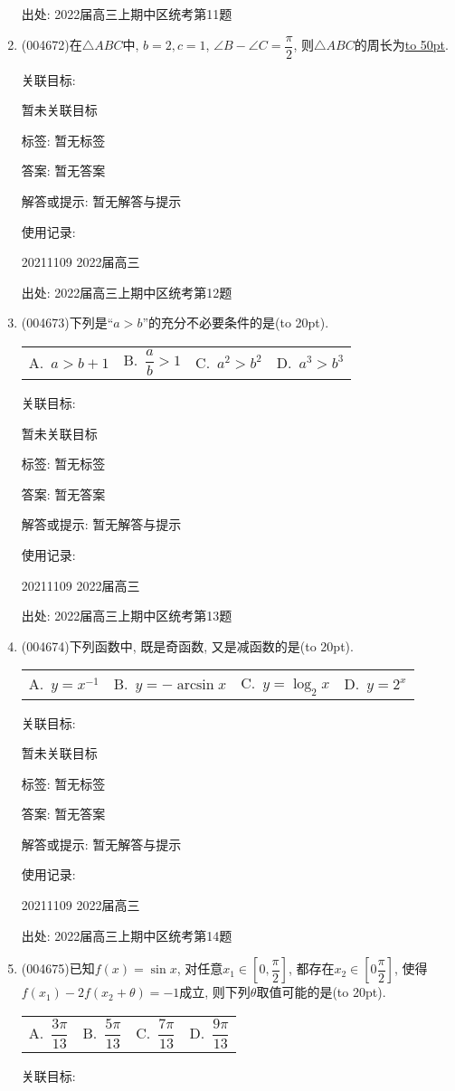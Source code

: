 \documentclass[10pt,a4paper]{article}
\newcommand{\blank}[1]{\underline{\hbox to #1pt{}}}
\newcommand{\bracket}[1]{(\hbox to #1pt{})}
\newcommand{\fourch}[4]{\par\begin{tabular}{p{.23\textwidth}p{.23\textwidth}p{.23\textwidth}p{.23\textwidth}}
A.~#1 &B.~#2& C.~#3& D.~#4
\end{tabular}}
\begin{document}
\begin{enumerate}[1.]
出处: 2022届高三上期中区统考第11题
\item { (004672)}在$\triangle ABC$中, $b=2,c=1$, $\angle B-\angle C=\dfrac{\pi}2$, 则$\triangle ABC$的周长为\blank{50}.


关联目标:

暂未关联目标



标签: 暂无标签

答案: 暂无答案

解答或提示: 暂无解答与提示

使用记录:

20211109	2022届高三	


出处: 2022届高三上期中区统考第12题
\item { (004673)}下列是``$a>b$''的充分不必要条件的是\bracket{20}.
\fourch{$a>b+1$}{$\dfrac ab>1$}{$a^2>b^2$}{$a^3>b^3$}


关联目标:

暂未关联目标



标签: 暂无标签

答案: 暂无答案

解答或提示: 暂无解答与提示

使用记录:

20211109	2022届高三	


出处: 2022届高三上期中区统考第13题
\item { (004674)}下列函数中, 既是奇函数, 又是减函数的是\bracket{20}.
\fourch{$y=x^{-1}$}{$y=-\arcsin x$}{$y=\log_2x$}{$y=2^x$}


关联目标:

暂未关联目标



标签: 暂无标签

答案: 暂无答案

解答或提示: 暂无解答与提示

使用记录:

20211109	2022届高三	


出处: 2022届高三上期中区统考第14题
\item { (004675)}已知$f(x)=\sin x$, 对任意$x_1 \in[0,\dfrac{\pi}2]$, 都存在$x_2\in [ 0\dfrac{\pi}2]$, 使得$f(x_1)-2f(x_2+\theta)=-1$成立, 则下列$\theta$取值可能的是\bracket{20}.
\fourch{$\dfrac{3\pi}{13}$}{$\dfrac{5\pi}{13}$}{$\dfrac{7\pi}{13}$}{$\dfrac{9\pi}{13}$}


关联目标:


\end{enumerate}
\end{document}
